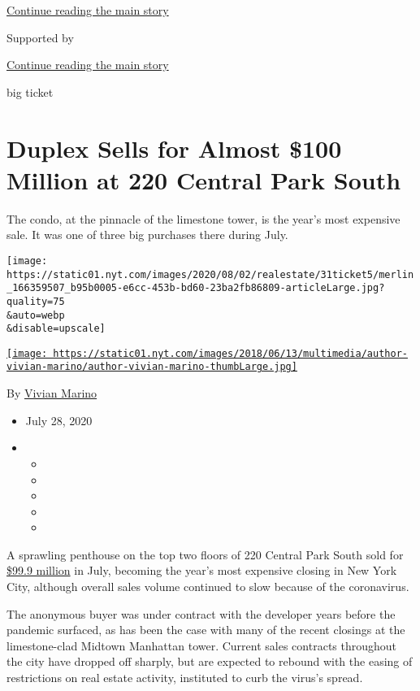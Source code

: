 \protect\hyperlink{after-top}{Continue reading the main story}

Supported by

\protect\hyperlink{after-sponsor}{Continue reading the main story}

big ticket

\hypertarget{duplex-sells-for-almost-100-million-at-220-central-park-south}{%
\section{Duplex Sells for Almost \$100 Million at 220 Central Park
South}\label{duplex-sells-for-almost-100-million-at-220-central-park-south}}

The condo, at the pinnacle of the limestone tower, is the year's most
expensive sale. It was one of three big purchases there during July.

\texttt{[image: https://static01.nyt.com/images/2020/08/02/realestate/31ticket5/merlin\_166359507\_b95b0005-e6cc-453b-bd60-23ba2fb86809-articleLarge.jpg?quality=75\\\&auto=webp\\\&disable=upscale]}

\href{https://www.nytimes.com/by/vivian-marino}{\texttt{[image: https://static01.nyt.com/images/2018/06/13/multimedia/author-vivian-marino/author-vivian-marino-thumbLarge.jpg]}}

By \href{https://www.nytimes.com/by/vivian-marino}{Vivian Marino}

\begin{itemize}
\item
  July 28, 2020
\item
  \begin{itemize}
  \item
  \item
  \item
  \item
  \item
  \end{itemize}
\end{itemize}

A sprawling penthouse on the top two floors of 220 Central Park South
sold for
\href{https://a836-acris.nyc.gov/DS/DocumentSearch/DocumentDetail?doc_id=2020072400904001}{\$99.9
million} in July, becoming the year's most expensive closing in New York
City, although overall sales volume continued to slow because of the
coronavirus.

The anonymous buyer was under contract with the developer years before
the pandemic surfaced, as has been the case with many of the recent
closings at the limestone-clad Midtown Manhattan tower. Current sales
contracts throughout the city have dropped off sharply, but are expected
to rebound with the easing of restrictions on real estate activity,
instituted to curb the virus's spread.

